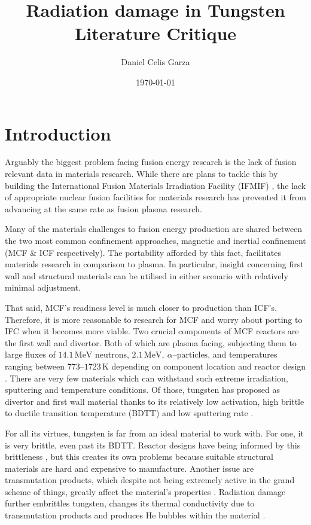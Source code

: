 \documentclass[12pt, a4paper]{article}
\title{Radiation damage in Tungsten Literature Critique}
\author{Daniel Celis Garza}
\date{\today}
\begin{document}
	\maketitle
	\section{Introduction}\label{s:intro}
		Arguably the biggest problem facing fusion energy research is the lack of fusion relevant data in materials research. While there are plans to tackle this by building the International Fusion Materials Irradiation Facility (IFMIF) \cite{ifmif}, the lack of appropriate nuclear fusion facilities for materials research has prevented it from advancing at the same rate as fusion plasma research.
		
		Many of the materials challenges to fusion energy production are shared between the two most common confinement approaches, magnetic and inertial confinement (MCF \& ICF respectively). The portability afforded by this fact, facilitates materials research in comparison to plasma. In particular, insight concerning first wall and structural materials can be utilised in either scenario with relatively minimal adjustment.
		
		That said, MCF's readiness level is much closer to production than ICF's. Therefore, it is more reasonable to research for MCF and worry about porting to IFC when it becomes more viable. Two crucial components of MCF reactors are the first wall and divertor. Both of which are plasma facing, subjecting them to large fluxes of $14.1\, \textrm{MeV}$ neutrons, $2.1\, \textrm{MeV},~\alpha\textrm{--particles}$, and temperatures ranging between $773\textrm{--}1723 \, \textrm{K}$ depending on component location and reactor design \cite{litrev}. There are very few materials which can withstand such extreme irradiation, sputtering and temperature conditions. Of those, tungsten has proposed as divertor and first wall material thanks to its relatively low activation, high brittle to ductile transition temperature (BDTT) and low sputtering rate \cite{wdivwall}.
		
		For all its virtues, tungsten is far from an ideal material to work with. For one, it is very brittle, even past its BDTT. Reactor designs have being informed by this brittleness \cite{bdtt}, but this creates its own problems because suitable structural materials are hard and expensive to manufacture. Another issue are transmutation products, which despite not being extremely active in the grand scheme of things, greatly affect the material's properties \cite{transmute}. Radiation damage further embrittles tungsten, changes its thermal conductivity due to transmutation products and produces He bubbles within the material \cite{nirrprop,nirpropmic,helium,ionirrprop,ionirrprop2,ionirrmic,hardening}.
		
\end{document}

